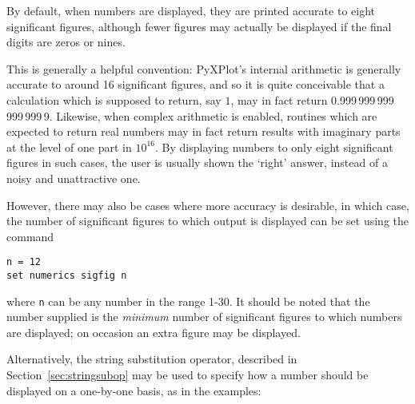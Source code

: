 By default, when numbers are displayed, they are printed accurate to eight
significant figures, although fewer figures may actually be displayed if the
final digits are zeros or nines.

This is generally a helpful convention: PyXPlot's internal arithmetic is
generally accurate to around 16 significant figures, and so it is quite
conceivable that a calculation which is supposed to return, say $1$, may in
fact return 0.999\,999\,999\,999\,999\,9. Likewise, when complex arithmetic is
enabled, routines which are expected to return real numbers may in fact return
results with imaginary parts at the level of one part in $10^{16}$.  By
displaying numbers to only eight significant figures in such cases, the user is
usually shown the `right' answer, instead of a noisy and unattractive one.

However, there may also be cases where more accuracy is desirable, in which
case, the number of significant figures to which output is displayed can be set
using the command

\begin{verbatim}
n = 12
set numerics sigfig n
\end{verbatim}

\noindent where {\tt n} can be any number in the range 1-30. It should be noted
that the number supplied is the {\it minimum} number of significant figures to
which numbers are displayed; on occasion an extra figure may be displayed.

Alternatively, the string substitution operator, described in
Section~\ref{sec:stringsubop} may be used to specify how a number should be
displayed on a one-by-one basis, as in the examples:

\vspace{3mm}
{\footnotesize
{}\newline
{}\newline
{}\newline
{}\newline
{}\newline
{}\newline
{}\newline
{}\vspace{3mm}
}


